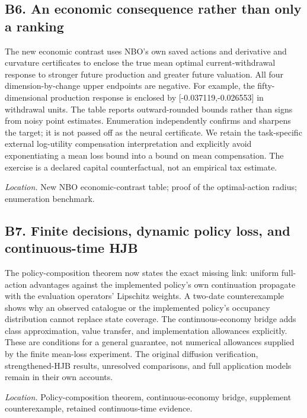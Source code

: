 \documentclass[ecta,nameyear,draft]{econsocart}
\theoremstyle{definition}
\theoremstyle{remark}
\begin{document}
\subsection*{B6. An economic consequence rather than only a ranking}

The new economic contrast uses NBO's own saved actions and derivative and curvature certificates to enclose the true mean optimal current-withdrawal response to stronger future production and greater future valuation. All four dimension-by-change upper endpoints are negative. For example, the fifty-dimensional production response is enclosed by [-0.037119,-0.026553] in withdrawal units. The table reports outward-rounded bounds rather than signs from noisy point estimates. Enumeration independently confirms and sharpens the target; it is not passed off as the neural certificate. We retain the task-specific external log-utility compensation interpretation and explicitly avoid exponentiating a mean loss bound into a bound on mean compensation. The exercise is a declared capital counterfactual, not an empirical tax estimate.


\par\smallskip\noindent\emph{Location.} New NBO economic-contrast table; proof of the optimal-action radius; enumeration benchmark.

\subsection*{B7. Finite decisions, dynamic policy loss, and continuous-time HJB}

The policy-composition theorem now states the exact missing link: uniform full-action advantages against the implemented policy's own continuation propagate with the evaluation operators' Lipschitz weights. A two-date counterexample shows why an observed catalogue or the implemented policy's occupancy distribution cannot replace state coverage. The continuous-economy bridge adds class approximation, value transfer, and implementation allowances explicitly. These are conditions for a general guarantee, not numerical allowances supplied by the finite mean-loss experiment. The original diffusion verification, strengthened-HJB results, unresolved comparisons, and full application models remain in their own accounts.


\par\smallskip\noindent\emph{Location.} Policy-composition theorem, continuous-economy bridge, supplement counterexample, retained continuous-time evidence.
\end{document}
